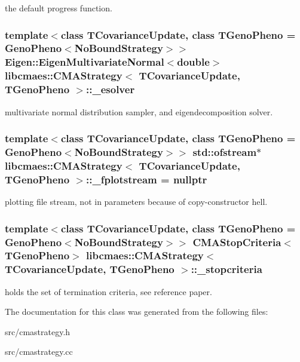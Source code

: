 the default progress function. \hypertarget{classlibcmaes_1_1CMAStrategy_ad9d6fe34da1fb94315e86625210fe009}{
\subsubsection[{\+\_\+esolver}]{\setlength{\rightskip}{0pt plus 5cm}template$<$class T\+Covariance\+Update, class T\+Geno\+Pheno  = Geno\+Pheno$<$\+No\+Bound\+Strategy$>$$>$ {\bf Eigen\+::\+Eigen\+Multivariate\+Normal}$<$double$>$ {\bf libcmaes\+::\+C\+M\+A\+Strategy}$<$ T\+Covariance\+Update, T\+Geno\+Pheno $>$\+::\+\_\+esolver\hspace{0.3cm}{\ttfamily [protected]}}}\label{classlibcmaes_1_1CMAStrategy_ad9d6fe34da1fb94315e86625210fe009}
multivariate normal distribution sampler, and eigendecomposition solver. \hypertarget{classlibcmaes_1_1CMAStrategy_ad05db57e25a5aa2d4abe9cb030406236}{
\subsubsection[{\+\_\+fplotstream}]{\setlength{\rightskip}{0pt plus 5cm}template$<$class T\+Covariance\+Update, class T\+Geno\+Pheno  = Geno\+Pheno$<$\+No\+Bound\+Strategy$>$$>$ std\+::ofstream$\ast$ {\bf libcmaes\+::\+C\+M\+A\+Strategy}$<$ T\+Covariance\+Update, T\+Geno\+Pheno $>$\+::\+\_\+fplotstream = nullptr\hspace{0.3cm}{\ttfamily [protected]}}}\label{classlibcmaes_1_1CMAStrategy_ad05db57e25a5aa2d4abe9cb030406236}
plotting file stream, not in parameters because of copy-\/constructor hell. \hypertarget{classlibcmaes_1_1CMAStrategy_af7b7c6bf3018f5e3d57f2875215bba0c}{
\subsubsection[{\+\_\+stopcriteria}]{\setlength{\rightskip}{0pt plus 5cm}template$<$class T\+Covariance\+Update, class T\+Geno\+Pheno  = Geno\+Pheno$<$\+No\+Bound\+Strategy$>$$>$ {\bf C\+M\+A\+Stop\+Criteria}$<$T\+Geno\+Pheno$>$ {\bf libcmaes\+::\+C\+M\+A\+Strategy}$<$ T\+Covariance\+Update, T\+Geno\+Pheno $>$\+::\+\_\+stopcriteria\hspace{0.3cm}{\ttfamily [protected]}}}\label{classlibcmaes_1_1CMAStrategy_af7b7c6bf3018f5e3d57f2875215bba0c}
holds the set of termination criteria, see reference paper. 

The documentation for this class was generated from the following files\+:\begin{DoxyCompactItemize}
\item 
src/cmastrategy.\+h\item 
src/cmastrategy.\+cc\end{DoxyCompactItemize}
